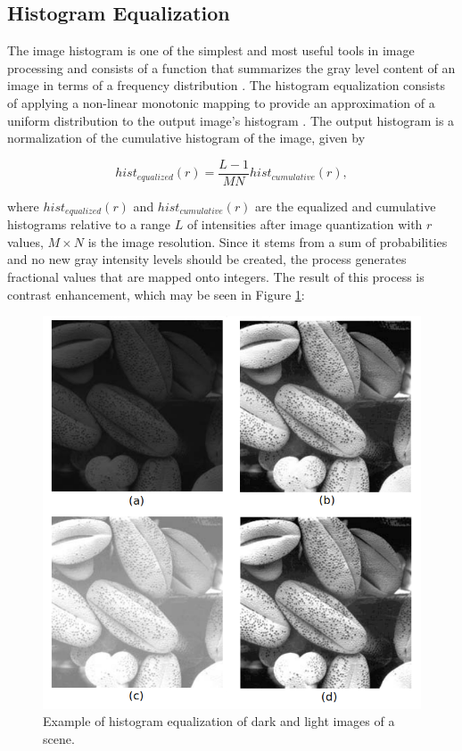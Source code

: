 \subsection{Histogram Equalization}

The image histogram is one of the simplest and most useful tools in image processing and consists of a function that summarizes the gray level content of an image in terms of a frequency distribution \cite{castleman1996digital}. The histogram equalization consists of applying a non-linear monotonic mapping to provide an approximation of a uniform distribution to the output image's histogram \cite{gonzalez2018digital}. The output histogram is a normalization of the cumulative histogram of the image, given by

\begin{equation}
\label{eqn:histogram_equalization}
hist_{equalized}(r) = \frac{L - 1}{MN} hist_{cumulative}(r),
\end{equation}

\noindent where $hist_{equalized}(r)$ and $hist_{cumulative}(r)$ are the equalized and cumulative histograms relative to a range $L$ of intensities after image quantization with $r$ values, $M \times N$ is the image resolution. Since it stems from a sum of probabilities and no new gray intensity levels should be created, the process generates fractional values that are mapped onto integers. The result of this process is contrast enhancement, which may be seen in Figure \ref{fig:histogram_equalization}:

\begin{figure}[htb]
	\centering
	\caption{\label{fig:histogram_equalization} Example of histogram equalization of dark and light images of a scene.} 
	\begin{center}
	    \includegraphics[scale=0.5]{images/histogram_equalization.png}
	\end{center}
	\centering
\end{figure}

